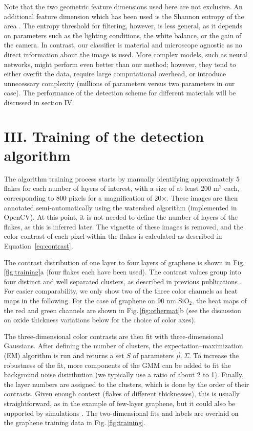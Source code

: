 \documentclass[reprint, prl, superscriptaddress, floatfix]{revtex4-2}
\newcommand{\fig}[1]{Fig.\,\ref{#1}}
\begin{document}
Note that the two geometric feature dimensions used here are not exclusive. 
An additional feature dimension which has been used is the Shannon entropy of the area \cite{Masubuchi2018}.
The entropy threshold for filtering, however, is less general, as it depends on parameters such as the lighting conditions, the white balance, or the gain of the camera. 
In contrast, our classifier is material and microscope agnostic as no direct information about the image is used.
More complex models, such as neural networks, might perform even better than our method; however, they tend to either overfit the data, require large computational overhead, or introduce unnecessary complexity (millions of parameters versus two parameters in our case).
The performance of the detection scheme for different materials will be discussed in section IV.

\section{III. Training of the detection algorithm}


The algorithm training process starts by manually identifying approximately 5 flakes for each number of layers of interest, with a size of at least 200 \textmu m$^2$ each, corresponding to 800 pixels for a magnification of 20$\times$.
These images are then annotated semi-automatically using the watershed algorithm (implemented in OpenCV).
At this point, it is not needed to define the number of layers of the flakes, as this is inferred later. 
The vignette of these images is removed, and the color contrast of each pixel within the flakes is calculated as described in Equation~\ref{eq:contrast}.

The contrast distribution of one layer to four layers of graphene is shown in \fig{fig:training}a (four flakes each have been used).
The contrast values group into four distinct and well separated clusters, as described in previous publications \cite{Masubuchi2019, Li2019Sep, Sterbentz2021Mar}.
For easier comparability, we only show two of the three color channels as heat maps in the following. 
For the case of graphene on 90 nm SiO$_2$, the heat maps of the red and green channels are shown in \fig{fig:othermat}b (see the discussion on oxide thickness variations below for the choice of color axes).

The three-dimensional color contrasts are then fit with three-dimensional Gaussians.
After defining the number of clusters, the expectation–maximization (EM) algorithm \cite{Pedregosa2011} is run and returns a set $S$ of parameters $\vec{\mu}, \Sigma$. 
To increase the robustness of the fit, more components of the GMM can be added to fit the background noise distribution (we typically use a ratio of about 2 to 1).
Finally, the layer numbers are assigned to the clusters, which is done by the order of their contrasts.
Given enough context (flakes of different thicknesses), this is usually straightforward, as in the example of few-layer graphene, but it could also be supported by simulations \cite{Muller2015}.  
The two-dimensional fits and labels are overlaid on the graphene training data in \fig{fig:training}.
\end{document}
